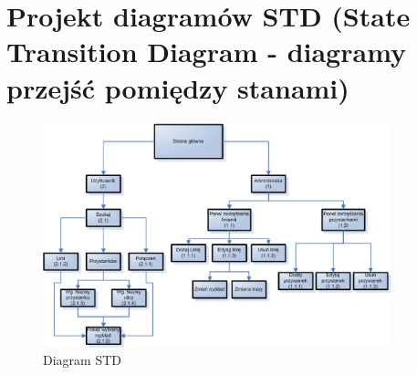 \section{Projekt diagramów STD (State Transition Diagram - diagramy przejść pomiędzy
stanami)}

\begin{figure}[!htp]
  \centering
  \includegraphics[width=0.9\textwidth]{./img/std.eps}
  \caption{Diagram STD}
  \label{fig:scr3}
\end{figure}
